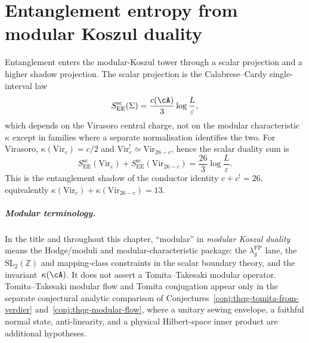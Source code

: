 \chapter{Entanglement entropy from modular Koszul duality}
\label{chap:entanglement-modular-koszul}

\providecommand{\MC}{\mathrm{MC}}
\providecommand{\Sh}{\mathrm{Sh}}
\providecommand{\Tr}{\operatorname{Tr}}
\providecommand{\rank}{\operatorname{rank}}
\providecommand{\id}{\mathrm{id}}
\providecommand{\Res}{\operatorname{Res}}
\providecommand{\BTZ}{\mathrm{BTZ}}
\providecommand{\EE}{\mathrm{EE}}
\providecommand{\QES}{\mathrm{QES}}

Entanglement enters the modular-Koszul tower through a scalar
projection and a higher shadow projection.  The scalar projection is
the Calabrese--Cardy single-interval law
\[
 S_{\EE}^{\mathrm{sc}}(\Sigma)
 = \frac{c(\cA)}{3}\log\frac{L}{\varepsilon},
\]
which depends on the Virasoro central charge, not on the modular
characteristic~$\kappa$ except in families where a separate
normalisation identifies the two.  For Virasoro,
$\kappa(\mathrm{Vir}_c)=c/2$ and
$\mathrm{Vir}_c^!\simeq\mathrm{Vir}_{26-c}$, hence the scalar
duality sum is
\[
 S_{\EE}^{\mathrm{sc}}(\mathrm{Vir}_c)
 +S_{\EE}^{\mathrm{sc}}(\mathrm{Vir}_{26-c})
 = \frac{26}{3}\log\frac{L}{\varepsilon}.
\]
This is the entanglement shadow of the conductor identity
$c+c^!=26$, equivalently
$\kappa(\mathrm{Vir}_c)+\kappa(\mathrm{Vir}_{26-c})=13$.

\paragraph{Modular terminology.}
In the title and throughout this chapter, ``modular'' in
\emph{modular Koszul duality} means the Hodge/moduli and
modular-characteristic package: the $\lambda_g^{\mathrm{FP}}$ lane,
the $\mathrm{SL}_2(\mathbb Z)$ and mapping-class constraints in the
scalar boundary theory, and the invariant~$\kappa(\cA)$.  It does not
assert a Tomita--Takesaki modular operator.  Tomita--Takesaki modular
flow and Tomita conjugation appear only in the separate conjectural
analytic comparison of
Conjectures~\ref{conj:thqg-tomita-from-verdier}
and~\ref{conj:thqg-modular-flow}, where a unitary sewing envelope,
a faithful normal state, anti-linearity, and a physical Hilbert-space
inner product are additional hypotheses.


